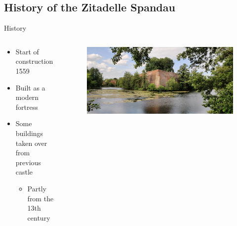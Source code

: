\documentclass[light]{lutbeamer} %
\begin{document}
\subsection{History of the Zitadelle Spandau}
\begin{frame}{History}
    \begin{columns}
    \begin{column}{0.5\textwidth}
            \begin{itemize}
                \item Start of construction 1559 \cite{zitadelleberlin}
                \item Built as a modern fortress
                \item Some buildings taken over from previous castle
                \begin{itemize}
                    \item Partly from the 13th century
                \end{itemize}
            \end{itemize}
    \end{column}
    \begin{column}{0.5\textwidth}
        \begin{figure}
        \centering
            \vspace*{-2.5cm}
            \includegraphics[trim= 1200 0 0 0,clip, height=\paperheight]{figures/citadel_outer_view.jpg}
        \end{figure}
    \end{column}
    \end{columns}
\end{frame}
\end{document}
